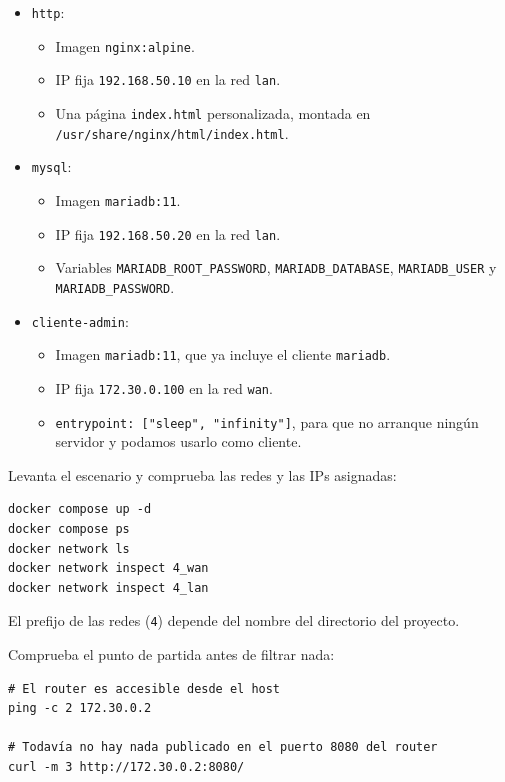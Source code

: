 \documentclass[a4paper]{article}
\begin{document}
\begin{itemize}
\item \texttt{http}:
\begin{itemize}
\item Imagen \texttt{nginx:alpine}.
\item IP fija \texttt{192.168.50.10} en la red \texttt{lan}.
\item Una página \texttt{index.html} personalizada, montada en \texttt{/usr/share/nginx/html/index.html}.
\end{itemize}
\item \texttt{mysql}:
\begin{itemize}
\item Imagen \texttt{mariadb:11}.
\item IP fija \texttt{192.168.50.20} en la red \texttt{lan}.
\item Variables \texttt{MARIADB\_ROOT\_PASSWORD}, \texttt{MARIADB\_DATABASE}, \texttt{MARIADB\_USER} y \texttt{MARIADB\_PASSWORD}.
\end{itemize}
\item \texttt{cliente-admin}:
\begin{itemize}
\item Imagen \texttt{mariadb:11}, que ya incluye el cliente \texttt{mariadb}.
\item IP fija \texttt{172.30.0.100} en la red \texttt{wan}.
\item \texttt{entrypoint: ["sleep", "infinity"]}, para que no arranque ningún servidor y podamos usarlo como cliente.
\end{itemize}
\end{itemize}

Levanta el escenario y comprueba las redes y las IPs asignadas:

\begin{verbatim}
docker compose up -d
docker compose ps
docker network ls
docker network inspect 4_wan
docker network inspect 4_lan
\end{verbatim}

El prefijo de las redes (\texttt{4}) depende del nombre del directorio del proyecto.

Comprueba el punto de partida antes de filtrar nada:

\begin{verbatim}
# El router es accesible desde el host
ping -c 2 172.30.0.2

# Todavía no hay nada publicado en el puerto 8080 del router
curl -m 3 http://172.30.0.2:8080/
\end{verbatim}
\end{document}
